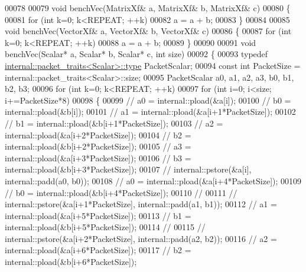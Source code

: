 \begin{DoxyCode}
00078 
00079 \textcolor{keywordtype}{void} benchVec(MatrixXf& a, MatrixXf& b, MatrixXf& c)
00080 \{
00081     \textcolor{keywordflow}{for} (\textcolor{keywordtype}{int} k=0; k<REPEAT; ++k)
00082         a = a + b;
00083 \}
00084 
00085 \textcolor{keywordtype}{void} benchVec(VectorXf& a, VectorXf& b, VectorXf& c)
00086 \{
00087     \textcolor{keywordflow}{for} (\textcolor{keywordtype}{int} k=0; k<REPEAT; ++k)
00088         a = a + b;
00089 \}
00090 
00091 \textcolor{keywordtype}{void} benchVec(Scalar* a, Scalar* b, Scalar* c, \textcolor{keywordtype}{int} size)
00092 \{
00093     \textcolor{keyword}{typedef} \hyperlink{group___sparse_core___module}{internal::packet\_traits<Scalar>::type} PacketScalar;
00094     \textcolor{keyword}{const} \textcolor{keywordtype}{int} PacketSize = internal::packet\_traits<Scalar>::size;
00095     PacketScalar a0, a1, a2, a3, b0, b1, b2, b3;
00096     \textcolor{keywordflow}{for} (\textcolor{keywordtype}{int} k=0; k<REPEAT; ++k)
00097         \textcolor{keywordflow}{for} (\textcolor{keywordtype}{int} i=0; i<size; i+=PacketSize*8)
00098         \{
00099 \textcolor{comment}{//             a0 = internal::pload(&a[i]);}
00100 \textcolor{comment}{//             b0 = internal::pload(&b[i]);}
00101 \textcolor{comment}{//             a1 = internal::pload(&a[i+1*PacketSize]);}
00102 \textcolor{comment}{//             b1 = internal::pload(&b[i+1*PacketSize]);}
00103 \textcolor{comment}{//             a2 = internal::pload(&a[i+2*PacketSize]);}
00104 \textcolor{comment}{//             b2 = internal::pload(&b[i+2*PacketSize]);}
00105 \textcolor{comment}{//             a3 = internal::pload(&a[i+3*PacketSize]);}
00106 \textcolor{comment}{//             b3 = internal::pload(&b[i+3*PacketSize]);}
00107 \textcolor{comment}{//             internal::pstore(&a[i], internal::padd(a0, b0));}
00108 \textcolor{comment}{//             a0 = internal::pload(&a[i+4*PacketSize]);}
00109 \textcolor{comment}{//             b0 = internal::pload(&b[i+4*PacketSize]);}
00110 \textcolor{comment}{//             }
00111 \textcolor{comment}{//             internal::pstore(&a[i+1*PacketSize], internal::padd(a1, b1));}
00112 \textcolor{comment}{//             a1 = internal::pload(&a[i+5*PacketSize]);}
00113 \textcolor{comment}{//             b1 = internal::pload(&b[i+5*PacketSize]);}
00114 \textcolor{comment}{//             }
00115 \textcolor{comment}{//             internal::pstore(&a[i+2*PacketSize], internal::padd(a2, b2));}
00116 \textcolor{comment}{//             a2 = internal::pload(&a[i+6*PacketSize]);}
00117 \textcolor{comment}{//             b2 = internal::pload(&b[i+6*PacketSize]);}

\end{DoxyCode}
